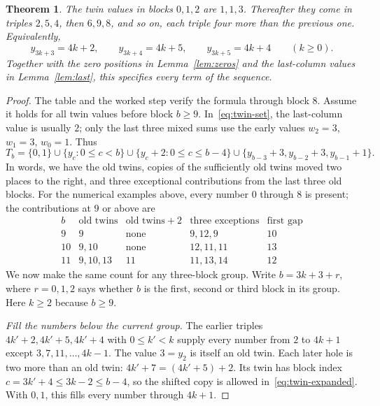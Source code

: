 \documentclass[11pt]{amsart}
\newtheorem{theorem}{Theorem}
\theoremstyle{remark}
\begin{document}
\begin{theorem}\label{thm:exact}
The twin values in blocks $0,1,2$ are $1,1,3$. Thereafter they come in triples $2,5,4$, then $6,9,8$, and so on, each triple four more than the previous one. Equivalently,
\[
 y_{3k+3}=4k+2,\qquad y_{3k+4}=4k+5,\qquad y_{3k+5}=4k+4\qquad(k\ge0).
\]
Together with the zero positions in Lemma~\ref{lem:zeros} and the last-column values in Lemma~\ref{lem:last}, this specifies every term of the sequence.
\end{theorem}

\begin{proof}
The table and the worked step verify the formula through block $8$. Assume it holds for all twin values before block $b\ge9$. In~\eqref{eq:twin-set}, the last-column value is usually $2$; only the last three mixed sums use the early values $w_2=3$, $w_1=3$, $w_0=1$. Thus
\begin{equation}\label{eq:twin-expanded}
 T_b=\{0,1\}\cup\{y_c:0\le c<b\}\cup\{y_c+2:0\le c\le b-4\}
       \cup\{y_{b-3}+3,y_{b-2}+3,y_{b-1}+1\}.
\end{equation}
In words, we have the old twins, copies of the sufficiently old twins moved two places to the right, and three exceptional contributions from the last three old blocks. For the numerical examples above, every number $0$ through $8$ is present; the contributions at $9$ or above are
\[
\begin{array}{c|c|c|c|c}
 b & \text{old twins} & \text{old twins}+2 & \text{three exceptions} & \text{first gap}\\ \hline
 9 & 9 & \text{none} & 9,12,9 & 10\\
 10 & 9,10 & \text{none} & 12,11,11 & 13\\
 11 & 9,10,13 & 11 & 11,13,14 & 12
\end{array}
\]
We now make the same count for any three-block group. Write $b=3k+3+r$, where $r=0,1,2$ says whether $b$ is the first, second or third block in its group. Here $k\ge2$ because $b\ge9$.

\emph{Fill the numbers below the current group.} The earlier triples $4k'+2,4k'+5,4k'+4$ with $0\le k'<k$ supply every number from $2$ to $4k+1$ except $3,7,11,\ldots,4k-1$. The value $3=y_2$ is itself an old twin. Each later hole is two more than an old twin: $4k'+7=(4k'+5)+2$. Its twin has block index $c=3k'+4\le3k-2\le b-4$, so the shifted copy is allowed in~\eqref{eq:twin-expanded}. With $0,1$, this fills every number through $4k+1$.


\end{proof}
\end{document}
